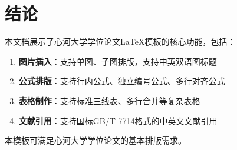 
\chapter{结论}

本文档展示了心河大学学位论文LaTeX模板的核心功能，包括：

\begin{enumerate}
    \item \textbf{图片插入}：支持单图、子图排版，支持中英双语图标题
    \item \textbf{公式排版}：支持行内公式、独立编号公式、多行对齐公式
    \item \textbf{表格制作}：支持标准三线表、多行合并等复杂表格
    \item \textbf{文献引用}：支持国标GB/T 7714格式的中英文文献引用
\end{enumerate}

本模板可满足心河大学学位论文的基本排版需求。
